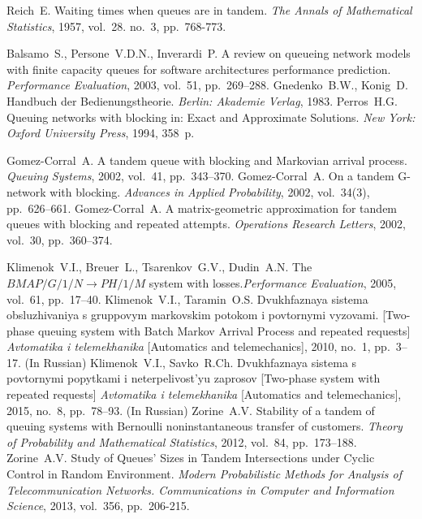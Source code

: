 \documentclass[a4paper,twoside]{article}
\theoremstyle{theorem}
\theoremstyle{remark}
\newcommand{\No}{\textnumero}
\begin{document}
\begin{thebibliography}{99}
\bibitem{} Reich~E.  Waiting times when queues are in tandem. {\it The Annals of Mathematical Statistics}, 1957, vol.~28. no.~3, pp.~768-773.

\bibitem{} Balsamo~S., Persone~V.D.N., Inverardi~P. A review on queueing network models with finite capacity queues for software architectures performance prediction. {\it  Performance Evaluation}, 2003, vol.~51, pp.~269–288.
\bibitem{} Gnedenko~B.W., Konig~D. Handbuch der Bedienungstheorie. {\it Berlin: Akademie Verlag}, 1983. 
\bibitem{} Perros~H.G.  Queuing networks with blocking in: Exact and Approximate Solutions. {\it New York: Oxford University Press}, 1994, 358~p.

\bibitem{} Gomez-Corral~A.  A tandem queue with blocking and Markovian arrival process. {\it Queuing Systems}, 2002, vol.~41, pp.~343--370.
\bibitem{} Gomez-Corral~A. On a tandem G-network with blocking.  {\it Advances in Applied Probability}, 2002, vol.~34(3), pp.~626--661.
\bibitem{} Gomez-Corral~A. A matrix-geometric approximation for tandem queues with blocking and repeated attempts. {\it  Operations Research Letters}, 2002, vol.~30, pp.~360--374.

\bibitem{} Klimenok~V.I., Breuer~L., Tsarenkov~G.V., Dudin~A.N.  The $BMAP/G/1/N \to PH/1/M$ system with losses.{\it Performance Evaluation}, 2005, vol.~61, pp.~17--40.
\bibitem{} Klimenok~V.I., Taramin~O.S. Dvukhfaznaya sistema obsluzhivaniya s gruppovym markovskim potokom i povtornymi vyzovami. [Two-phase queuing system with Batch Markov Arrival Process and repeated requests] {\it Avtomatika i telemekhanika} [Automatics and telemechanics], 2010, no.~1, pp.~3--17. (In Russian)
\bibitem{} 
Klimenok~V.I., Savko~R.Ch. Dvukhfaznaya sistema s povtornymi popytkami i neterpelivost'yu zaprosov [Two-phase system with repeated requests] {\it Avtomatika i telemekhanika} [Automatics and telemechanics], 2015, no.~8, pp.~78--93. (In Russian)
\bibitem{} Zorine~A.V. Stability of a tandem of queuing systems with Bernoulli noninstantaneous transfer of customers. {\it Theory of Probability and Mathematical Statistics}, 2012, vol.~84, pp.~173--188.
\bibitem{} Zorine~A.V. Study of Queues' Sizes in Tandem Intersections under Cyclic Control in Random Environment. {\it Modern Probabilistic Methods for Analysis of Telecommunication Networks. Communications in Computer and Information Science}, 2013, vol.~356, pp.~206-215.


\end{thebibliography}
\end{document}
